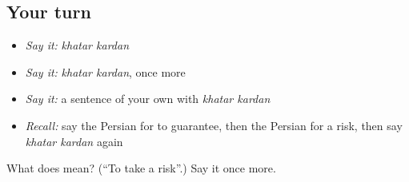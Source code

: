 \subsection*{Your turn}
\begin{itemize}
\raggedright
  \item \emph{Say it:} \emph{khatar kardan}
  \item \emph{Say it:} \emph{khatar kardan}, once more
  \item \emph{Say it:} a sentence of your own with \emph{khatar kardan}
  \item \emph{Recall:} say the Persian for to guarantee, then the Persian for a risk, then say \emph{khatar kardan} again
\end{itemize}

\begin{tcolorbox}[breakable,colback=teal!4,colframe=teal!35!black,title={Before you move on}]
What does   mean? (\textquotedblleft{}To take a risk\textquotedblright{}.) Say it once more.
\end{tcolorbox}
